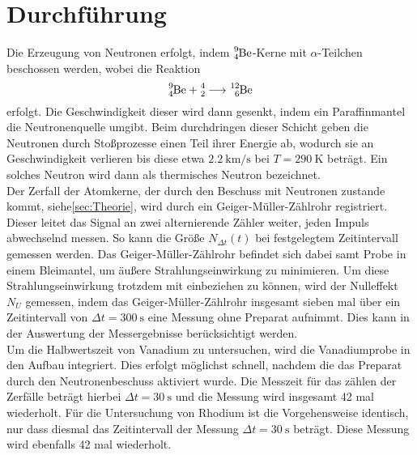 \section{Durchführung}
\label{sec:Durchführung}

Die Erzeugung von Neutronen erfolgt, indem $\ce{^{9}_{4}Be}$-Kerne mit $\alpha$-Teilchen beschossen werden, 
wobei die Reaktion 
\begin{equation}
    \ce{^{9}_{4}Be} + \ce{^{4}_{2}} \longrightarrow \ce{^{12}_{6}Be}
\end{equation}
erfolgt. Die Geschwindigkeit dieser wird dann gesenkt, indem ein Paraffinmantel die Neutronenquelle umgibt. Beim durchdringen 
dieser Schicht geben die Neutronen durch Stoßprozesse einen Teil ihrer Energie ab, wodurch sie an Geschwindigkeit verlieren bis 
diese etwa $\SI{2.2}{\kilo\metre\per\s} $ bei $T=\SI{290}{\kelvin} $ beträgt. Ein solches Neutron wird dann als thermisches 
Neutron bezeichnet. 
\\
Der Zerfall der Atomkerne, der durch den Beschuss mit Neutronen zustande kommt, siehe\ref{sec:Theorie}, wird durch ein 
Geiger-Müller-Zählrohr registriert. Dieser leitet das Signal an zwei alternierende Zähler weiter, jeden Impuls abwechselnd messen.
So kann die Größe $N_{\Delta t}(t) $ bei festgelegtem Zeitintervall gemessen werden. Das Geiger-Müller-Zählrohr befindet sich dabei 
samt Probe in einem Bleimantel, um äußere Strahlungseinwirkung zu minimieren. Um diese Strahlungseinwirkung trotzdem mit 
einbeziehen zu können, wird der Nulleffekt $N_U$ gemessen, indem das Geiger-Müller-Zählrohr insgesamt sieben mal über ein 
Zeitintervall von $\Delta t =\SI{300}{\s} $ eine Messung ohne Preparat aufnimmt. Dies kann in der Auswertung der Messergebnisse 
berücksichtigt werden.
\\
Um die Halbwertszeit von Vanadium zu untersuchen, wird die Vanadiumprobe in den Aufbau integriert. Dies erfolgt möglichst schnell,
nachdem die das Preparat durch den Neutronenbeschuss aktiviert wurde. Die Messzeit für das zählen der Zerfälle beträgt hierbei 
$\Delta t= \SI{30}{\s} $ und die Messung wird insgesamt 42 mal wiederholt. Für die Untersuchung von Rhodium ist die 
Vorgehensweise identisch, nur dass diesmal das Zeitintervall der Messung $\Delta t= \SI{30}{\s} $ beträgt. Diese Messung wird 
ebenfalls 42 mal wiederholt. 